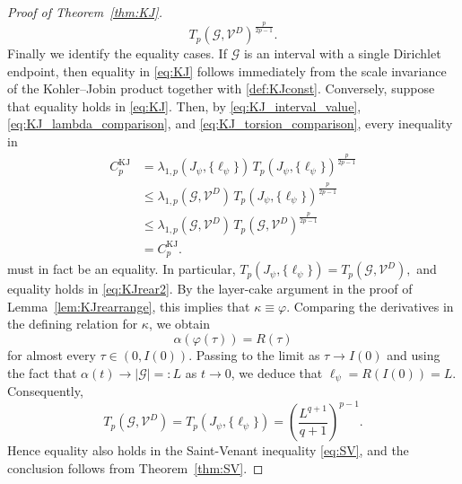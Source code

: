 \documentclass[12pt,a4paper]{article}
\numberwithin{equation}{section}
\begin{document}
\begin{proof}[Proof of Theorem~\ref{thm:KJ}]
\[		T_p(\mathcal G,\mathcal V^D)^{\frac{p}{2p-1}}.
		\]
Finally we identify the equality cases. If $\mathcal G$ is an interval
	with a single Dirichlet endpoint, then equality in \eqref{eq:KJ} follows
	immediately from the scale invariance of the Kohler--Jobin product together
	with \eqref{def:KJconst}. Conversely, suppose that equality holds in
	\eqref{eq:KJ}. Then, by
	\eqref{eq:KJ_interval_value}, \eqref{eq:KJ_lambda_comparison}, and
	\eqref{eq:KJ_torsion_comparison}, every inequality in
\begin{align*}
	C_p^{\mathrm{KJ}}
	&=
	\lambda_{1,p}(J_\psi,\{\ell_\psi\})\,
	T_p(J_\psi,\{\ell_\psi\})^{\frac{p}{2p-1}}
	\\
	&\le
	\lambda_{1,p}(\mathcal G,\mathcal V^D)\,
	T_p(J_\psi,\{\ell_\psi\})^{\frac{p}{2p-1}}
	\\
	&\le
	\lambda_{1,p}(\mathcal G,\mathcal V^D)\,
	T_p(\mathcal G,\mathcal V^D)^{\frac{p}{2p-1}}
	\\
	&=
	C_p^{\mathrm{KJ}}.
\end{align*}
	must in fact be an equality. In particular,
	\(
	T_p(J_\psi,\{\ell_\psi\})
	=
	T_p(\mathcal G,\mathcal V^D),
	\)
	and equality holds in \eqref{eq:KJrear2}. By the layer-cake argument in the
	proof of Lemma~\ref{lem:KJrearrange}, this implies that
	$\kappa\equiv\varphi$. Comparing the derivatives in the defining relation
	for $\kappa$, we obtain
	\[
	\alpha(\varphi(\tau))=R(\tau)
	\]
	for almost every $\tau\in(0,I(0))$. Passing to the limit as
	$\tau\to I(0)$ and using the fact that
	$\alpha(t)\to|\mathcal G|=:L$ as $t\to0$, we deduce that
	\(
	\ell_\psi=R(I(0))=L.
	\)
	Consequently,
	\[
	T_p(\mathcal G,\mathcal V^D)
	=
	T_p(J_\psi,\{\ell_\psi\})
	=
	\left(\frac{L^{q+1}}{q+1}\right)^{p-1}.
	\]
	Hence equality also holds in the Saint-Venant inequality \eqref{eq:SV}, and
	the conclusion follows from Theorem~\ref{thm:SV}.
	\end{proof}
\end{document}

